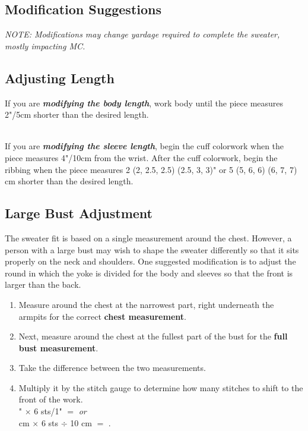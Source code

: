 \documentclass[12pt]{article}
\newcommand{\vocab}[1]{\emph{\textbf{#1}}} %
\newcommand{\blank}{\underline{\hspace{2em}} } %
\begin{document}
\begin{multicols}{2}
\newpage
\section*{Modification Suggestions}

\emph{NOTE: Modifications may change yardage required to complete the sweater, mostly impacting MC.}

\subsection*{Adjusting Length}
If you are \vocab{modifying the body length}, work body until the piece measures 2"/5cm shorter than the desired length.

~\\
If you are \vocab{modifying the sleeve length}, begin the cuff colorwork when the piece measures 4"/10cm from the wrist. After the cuff colorwork, begin the ribbing when the piece measures 2 (2, 2.5, 2.5) (2.5, 3, 3)" or 5 (5, 6, 6) (6, 7, 7) cm shorter than the desired length.

\subsection*{Large Bust Adjustment}

The sweater fit is based on a single measurement around the chest. However, a person with a large bust may wish to shape the sweater differently so that it sits properly on the neck and shoulders. One suggested modification is to adjust the round in which the yoke is divided for the body and sleeves so that the front is larger than the back.

\begin{enumerate}
\item Measure around the chest at the narrowest part, right underneath the armpits for the correct \textbf{chest measurement}. \blank

\item Next, measure around the chest at the fullest part of the bust for the \textbf{full bust measurement}. \blank

\item Take the difference between the two measurements. \blank

\item Multiply it by the stitch gauge to determine how many stitches to shift to the front of the work. \\
\blank" $\times$ 6 sts/1" $=$ \blank  \emph{or} \\ \blank cm $\times$ 6 sts $\div$ 10 cm $=$ \blank.


\end{enumerate}
\end{multicols}
\end{document}
